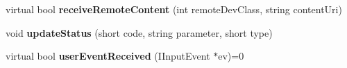 \begin{CompactItemize}
\item 
virtual bool {\bf receiveRemoteContent} (int remoteDevClass, string contentUri)\label{classbr_1_1pucrio_1_1telemidia_1_1ginga_1_1ncl_1_1multidevice_1_1FormatterMultiDevice_87cbdaf726f091ac278ec8d38c8e2237}

\item 
void \textbf{updateStatus} (short code, string parameter, short type)\label{classbr_1_1pucrio_1_1telemidia_1_1ginga_1_1ncl_1_1multidevice_1_1FormatterMultiDevice_bb2780bfc87cd74debbacb3680e03104}

\item 
virtual bool \textbf{userEventReceived} (IInputEvent $\ast$ev)=0\label{classbr_1_1pucrio_1_1telemidia_1_1ginga_1_1ncl_1_1multidevice_1_1FormatterMultiDevice_d0a639e2de60efb5c847f194e2f24bdc}

\end{CompactItemize}
